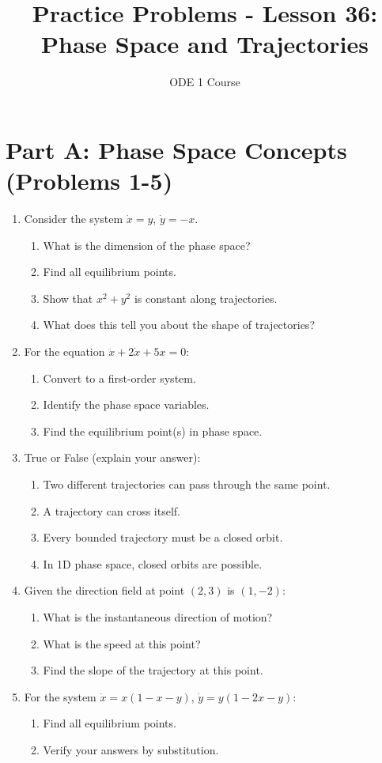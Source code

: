 \documentclass[12pt]{article}
\title{Practice Problems - Lesson 36: Phase Space and Trajectories}
\author{ODE 1 Course}
\date{}
\begin{document}
\maketitle

\section*{Part A: Phase Space Concepts (Problems 1-5)}

\begin{enumerate}
\item Consider the system $\dot{x} = y$, $\dot{y} = -x$.
\begin{enumerate}[label=(\alph*)]
    \item What is the dimension of the phase space?
    \item Find all equilibrium points.
    \item Show that $x^2 + y^2$ is constant along trajectories.
    \item What does this tell you about the shape of trajectories?
\end{enumerate}

\item For the equation $\ddot{x} + 2\dot{x} + 5x = 0$:
\begin{enumerate}[label=(\alph*)]
    \item Convert to a first-order system.
    \item Identify the phase space variables.
    \item Find the equilibrium point(s) in phase space.
\end{enumerate}

\item True or False (explain your answer):
\begin{enumerate}[label=(\alph*)]
    \item Two different trajectories can pass through the same point.
    \item A trajectory can cross itself.
    \item Every bounded trajectory must be a closed orbit.
    \item In 1D phase space, closed orbits are possible.
\end{enumerate}

\item Given the direction field at point $(2, 3)$ is $(1, -2)$:
\begin{enumerate}[label=(\alph*)]
    \item What is the instantaneous direction of motion?
    \item What is the speed at this point?
    \item Find the slope of the trajectory at this point.
\end{enumerate}

\item For the system $\dot{x} = x(1-x-y)$, $\dot{y} = y(1-2x-y)$:
\begin{enumerate}[label=(\alph*)]
    \item Find all equilibrium points.
    \item Verify your answers by substitution.
\end{enumerate}
\end{enumerate}
\end{document}
